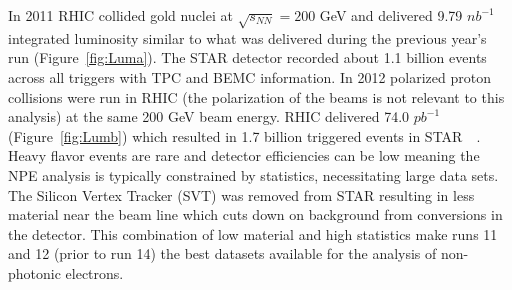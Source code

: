 In 2011 RHIC collided gold nuclei at $\sqrt{s_{NN}} = 200$ GeV and delivered 9.79 $nb^{-1}$ integrated luminosity similar to what was delivered during the previous year's run (Figure~\ref{fig:Luma}). The STAR detector recorded about 1.1 billion events across all triggers with TPC and BEMC information. In 2012 polarized proton collisions were run in RHIC (the polarization of the beams is not relevant to this analysis) at the same 200 GeV beam energy. RHIC delivered 74.0 $pb^{-1}$ (Figure~\ref{fig:Lumb}) which resulted in 1.7 billion triggered events in STAR~\cite{RHIC2011}~\cite{RHIC2012}. Heavy flavor events are rare and detector efficiencies can be low meaning the NPE analysis is typically constrained by statistics, necessitating large data sets. The Silicon Vertex Tracker (SVT) was removed from STAR resulting in less material near the beam line which cuts down on background from conversions in the detector. This combination of low material and high statistics make runs 11 and 12 (prior to run 14) the best datasets available for the analysis of non-photonic electrons.

